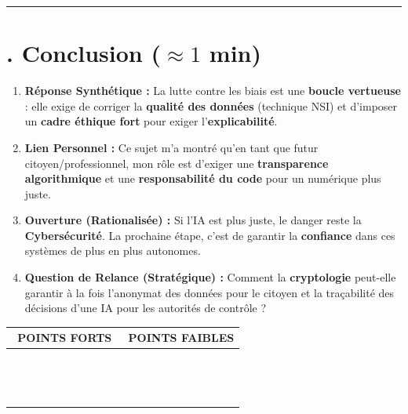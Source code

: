 \hrule

\section*{. Conclusion ($\approx 1$ min)}
\begin{enumerate}[label=\arabic*.]
    \item \textbf{Réponse Synthétique :} La lutte contre les biais est une \textbf{boucle vertueuse} : elle exige de corriger la \textbf{qualité des données} (technique NSI) et d'imposer un \textbf{cadre éthique fort} pour exiger l'\textbf{explicabilité}.
    \item \textbf{Lien Personnel :} Ce sujet m'a montré qu'en tant que futur citoyen/professionnel, mon rôle est d'exiger une \textbf{transparence algorithmique} et une \textbf{responsabilité du code} pour un numérique plus juste.
    \item \textbf{Ouverture (Rationalisée) :} Si l'IA est plus juste, le danger reste la \textbf{Cybersécurité}. La prochaine étape, c'est de garantir la \textbf{confiance} dans ces systèmes de plus en plus autonomes.
    \item \textbf{Question de Relance (Stratégique) :} Comment la \textbf{cryptologie} peut-elle garantir à la fois l'anonymat des données pour le citoyen et la traçabilité des décisions d'une IA pour les autorités de contrôle ?
\end{enumerate}

\newpage

\renewcommand{\arraystretch}{4} 

\begin{table}[h!]
\centering
\begin{tabular}{p{0.5\linewidth}|p{0.5\linewidth}} 
\hline
\multicolumn{1}{c|}{\textbf{POINTS FORTS}} & \multicolumn{1}{c}{\textbf{POINTS FAIBLES}} \\ 
\hline
& \\ %
& \\ %
& \\ %
& \\ %
& \\ %
& \\ %
& \\ %
& \\ %
& \\ %
& \\ %
& \\ %
& \\ %
& \\ %
& \\ %
\hline
\end{tabular}
\end{table}

